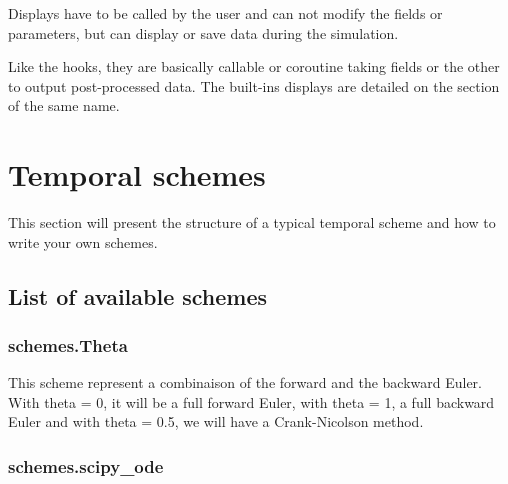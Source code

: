 \documentclass[letterpaper,10pt,english]{sphinxmanual}
\begin{document}
Displays have to be called by the user and can not modify the fields or parameters, but can display or save data during the simulation.

Like the hooks, they are basically callable or coroutine taking fields or the other to output post-processed data. The built-ins displays are detailed on the section of the same name.


\chapter{Temporal schemes}
\label{\detokenize{schemes:temporal-schemes}}\label{\detokenize{schemes:superlu}}\label{\detokenize{schemes::doc}}
This section will present the structure of a typical temporal scheme and how to write your own schemes.


\section{List of available schemes}
\label{\detokenize{schemes:list-of-available-schemes}}

\subsection{schemes.Theta}
\label{\detokenize{schemes:schemes-theta}}
\begin{sphinxVerbatim}[commandchars=\\\{\}]
   
\end{sphinxVerbatim}

This scheme represent a combinaison of the forward and the backward Euler. With theta = 0, it will be a full forward Euler, with theta = 1, a full backward Euler and with theta = 0.5, we will have a Crank-Nicolson method.


\subsection{schemes.scipy\_ode}
\label{\detokenize{schemes:schemes-scipy-ode}}
\begin{sphinxVerbatim}[commandchars=\\\{\}]
    
\end{sphinxVerbatim}
\end{document}
